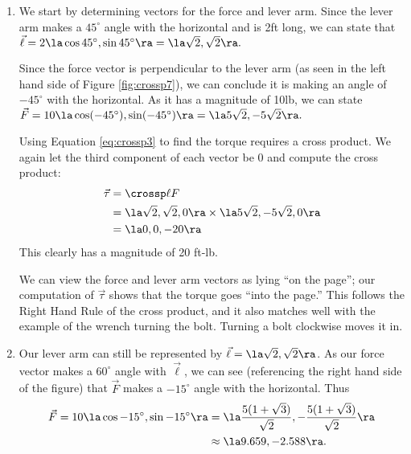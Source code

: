 {\begin{enumerate}
	\item We start by determining vectors for the force and lever arm. Since the lever arm makes a $45^\circ$ angle with the horizontal and is 2ft long, we can state that $\vec \ell = 2\la \cos 45^\circ,\sin 45^\circ\ra = \la \sqrt2,\sqrt2\ra.$
	
	Since the force vector is perpendicular to the lever arm (as seen in the left hand side of Figure \ref{fig:crossp7}), we can conclude it is making an angle of $-45^\circ$ with the horizontal. As it has a magnitude of 10lb, we can state $\vec F = 10\la \cos (-45^\circ), \sin(-45^\circ)\ra = \la 5\sqrt2,-5\sqrt2\ra.$
	
	Using Equation \eqref{eq:crossp3} to find the torque requires a cross product. We again let the third component of each vector be 0  and compute the cross product:
	\begin{align*}
	\vec\tau &= \crossp \ell F \\
				&= \la \sqrt2,\sqrt2,0\ra \times \la 5\sqrt2,-5\sqrt2,0\ra \\
				&= \la 0,0,-20\ra
	\end{align*}
	This clearly has a magnitude of 20 ft-lb.
	
	We can view the force and lever arm vectors as lying ``on the page''; our computation of $\vec\tau$ shows that the torque goes ``into the page.'' This follows the Right Hand Rule of the cross product, and it also matches well with the example of the wrench turning the bolt. Turning a bolt clockwise moves it in.
	
	\item		Our lever arm can still be represented by $\vec \ell = \la \sqrt2,\sqrt2\ra$. As our force vector makes a $60^\circ$ angle with $\vec \ell$, we can see (referencing the right hand side of the figure) that $\vec F$ makes a $-15^\circ$ angle with the horizontal. Thus 
	\begin{align*}
	\vec F = 10\la \cos-15^\circ,\sin-15^\circ\ra &= \la \frac{5(1+\sqrt3)}{\sqrt2},-\frac{5(1+\sqrt3)}{\sqrt2}\ra \\
	&\approx \la 9.659,-2.588\ra.\end{align*}
	

\end{enumerate}}
